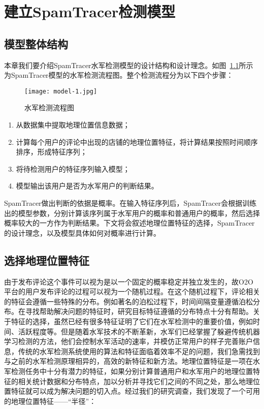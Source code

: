 
\chapter{建立SpamTracer检测模型}
\label{chap:model}


\section{模型整体结构}

本章我们要介绍SpamTracer水军检测模型的设计结构和设计理念。如图~\ref{fig:structure}所示为SpamTracer模型的水军检测流程图。整个检测流程分为以下四个步骤：

\begin{figure}[htbp]
	\centering
	\begin{minipage}[htbp]{\textwidth}
		\centering
		\texttt{[image: model-1.jpg]}
		\caption[水军检测流程图]
		{水军检测流程图\label{fig:structure}}		
	\end{minipage}     
\end{figure}

\begin{enumerate}
	\item[(1)] 从数据集中提取地理位置信息数据；
	\item[(2)] 计算每个用户的评论中出现的店铺的地理位置特征，将计算结果按照时间顺序排序，形成特征序列；
	\item[(3)] 将待检测用户的特征序列输入模型；
	\item[(4)] 模型输出该用户是否为水军用户的判断结果。
\end{enumerate}

SpamTracer做出判断的依据是概率。在输入特征序列后，SpamTracer会根据训练出的模型参数，分别计算该序列属于水军用户的概率和普通用户的概率，然后选择概率较大的一方作为判断结果。下文将会叙述地理位置特征的选择，SpamTracer的设计理念，以及模型具体如何对概率进行计算。


\section{选择地理位置特征}

由于发布评论这个事件可以视为是以一个固定的概率稳定并独立发生的，故O2O平台的用户发布评论的过程可以视为一个随机过程。在这个随机过程下，评论相关的特征会遵循一些特殊的分布。例如著名的泊松过程下，时间间隔变量遵循泊松分布。在寻找帮助解决问题的特征时，研究目标特征遵循的分布特点十分有帮助。关于特征的选择，虽然已经有很多特征证明了它们在水军检测中的重要价值，例如时间、活跃程度等。但是随着水军技术的不断革新，水军们已经掌握了躲避传统机器学习检测的方法，他们会控制水军活动的速率，并模仿正常用户的样子完善账户信息，传统的水军检测系统使用的算法和特征面临着效率不足的问题，我们急需找到与之前的水军检测原理相异的，高效的新特征和新方法。地理位置特征是一项在水军检测任务中十分有潜力的特征，如果分别计算普通用户和水军用户的地理位置特征的相关统计数据和分布特点，加以分析并寻找它们之间的不同之处，那么地理位置特征就可以成为解决问题的切入点。经过我们的研究调查，我们发现了一个可用的地理位置特征——“半径”：

